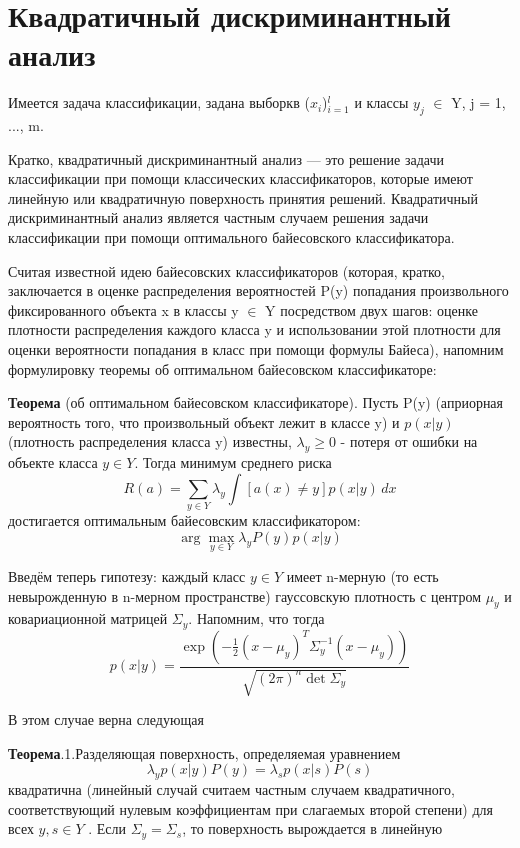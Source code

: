 \section{Квадратичный дискриминантный анализ}

Имеется задача классификации, задана выборкв ($x_{i}$)$_{i=1}^l$ и классы $y_j$ $\in$ Y, j = 1, ..., m.

Кратко, квадратичный дискриминантный анализ — это решение задачи классификации при помощи классических классификаторов, которые имеют линейную или квадратичную поверхность принятия решений. Квадратичный дискриминантный анализ является частным случаем решения задачи классификации при помощи оптимального байесовского классификатора.

Считая известной идею байесовских классификаторов (которая, кратко, заключается в оценке распределения вероятностей P(y) попадания произвольного фиксированного объекта x в классы y $\in$ Y посредством двух шагов: оценке плотности распределения каждого класса y и использовании этой плотности для оценки вероятности попадания в класс при помощи формулы Байеса), напомним формулировку теоремы об оптимальном байесовском классификаторе:

\textbf{Теорема} (об оптимальном байесовском классификаторе). Пусть P(y) (априорная вероятность того, что произвольный объект лежит в классе y) и $p(x|y)$ (плотность распределения класса y) известны, $\lambda _{y} \geq 0$ - потеря от ошибки на объекте класса $y \in Y$. Тогда минимум среднего риска \[ R(a) = \sum_{y \in Y} \lambda _{y}\int [a(x) \neq y]p(x|y)\,dx \] достигается оптимальным байесовским классификатором: \[\arg \max_{y \in Y}\lambda_{y}P(y)p(x|y)\]

Введём теперь гипотезу: каждый класс $y \in Y$ имеет n-мерную (то есть невырожденную в n-мерном пространстве) гауссовскую плотность с центром $\mu_{y}$ и ковариационной матрицей $\Sigma_{y}$. Напомним, что тогда \[p(x|y) = \frac{\exp(-\frac{1}{2}(x-\mu_y)^{T}\Sigma_{y}^{-1}(x-\mu_y))}{\sqrt{(2\pi)^{n}\det\Sigma_{y}}}\]

В этом случае верна следующая

\textbf{Теорема}.\newline1.Разделяющая поверхность, определяемая уравнением \[\lambda_y p(x|y) P(y) = \lambda_s p(x|s) P(s)\] квадратична (линейный случай считаем частным случаем квадратичного, соответствующий нулевым коэффициентам при слагаемых второй степени) для всех $y, s \in Y$ . Если $\Sigma_y = \Sigma_s$, то поверхность вырождается в линейную

